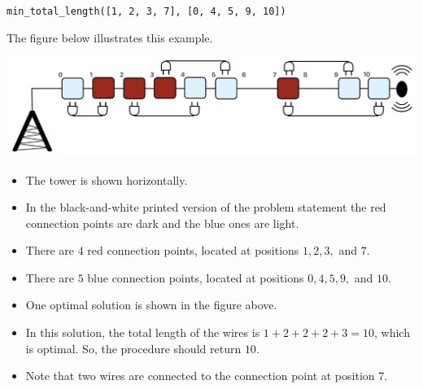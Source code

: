 \texttt{min\_total\_length([1, 2, 3, 7], [0, 4, 5, 9, 10])}

The figure below illustrates this example.

\includegraphics[scale=0.5]{wiring.png}

\begin{itemize}
\item The tower is shown horizontally.
\item In the black-and-white printed version of the problem statement the red connection points are dark and the blue ones are light.
\item There are $4$ red connection points, located at positions $1, 2, 3,$ and $7$.
\item There are $5$ blue connection points, located at positions $0, 4, 5, 9,$ and $10$.
\item One optimal solution is shown in the figure above.
\item In this solution, the total length of the wires is $1 + 2 + 2 + 2 + 3 = 10$, which is optimal. So, the procedure should return $10$.
\item Note that two wires are connected to the connection point at position $7$.
\end{itemize}